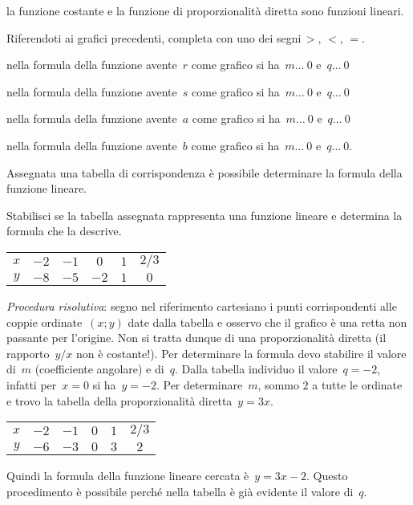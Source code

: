 \conclusione la funzione costante e la funzione di proporzionalità diretta sono 
funzioni lineari.

\begin{exrig}
 \begin{esempio}
Riferendoti ai grafici precedenti, completa con uno dei segni\,$>,\, <,\, =$.
\begin{itemize*}
\item nella formula della funzione avente~$r$ come grafico si ha~$m \ldots~0$ 
e~$q \ldots~0$
\item nella formula della funzione avente~$s$ come grafico si ha~$m \ldots~0$ 
e~$q \ldots~0$
\item nella formula della funzione avente~$a$ come grafico si ha~$m \ldots~0$ 
e~$q \ldots~0$
\item nella formula della funzione avente~$b$ come grafico si ha~$m \ldots~0$ 
e~$q \ldots~0$.
\end{itemize*}
 \end{esempio}
\end{exrig}
Assegnata una tabella di corrispondenza è possibile determinare la formula della 
funzione lineare.
\begin{exrig}
 \begin{esempio}
Stabilisci se la tabella assegnata rappresenta una funzione lineare e determina 
la formula che la descrive.
\begin{center}
 \begin{tabular}{cccccc}
 \toprule
 $x$ & $-2$ & $-1$ & $0$ & $1$ & $2/3$\\
 $y$ & $-8$ & $-5$ & $-2$ & $1$ & $0$\\
 \bottomrule
 \end{tabular}
\end{center}

\emph{Procedura risolutiva}: segno nel riferimento cartesiano i punti 
corrispondenti alle coppie ordinate~$(x;y)$
date dalla tabella e osservo che il grafico è una retta non passante per 
l'origine. Non si tratta dunque di una
proporzionalità diretta (il rapporto~$y/x$ non è costante!). Per determinare la 
formula devo stabilire
il valore di~$m$ (coefficiente angolare) e di~$q$.
Dalla tabella individuo il valore~$q=-2$, infatti per~$x=0$ si ha~$y=-2$. Per 
determinare~$m$, sommo
$2$ a tutte le ordinate e trovo la tabella della proporzionalità diretta~$y=3x$.
\begin{center}
 \begin{tabular}{cccccc}
 \toprule
 $x$ & $-2$ & $-1$ & $0$ & $1$ & $2/3$\\
 $y$ & $-6$ & $-3$ & $0$ & $3$ & $2$\\
 \bottomrule
 \end{tabular}
\end{center}
Quindi la formula della funzione lineare cercata è~$y=3x-2$.
Questo procedimento è possibile perché nella tabella è già evidente il valore 
di~$q$.
 \end{esempio}
\end{exrig}

